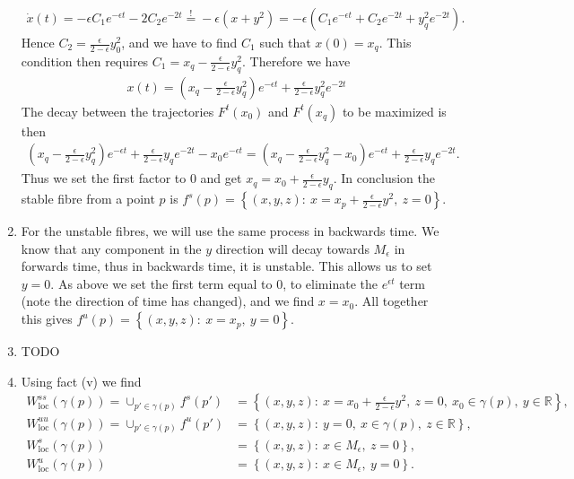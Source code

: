\begin{solution}[9.5]
\begin{enumerate}
\begin{align}
	\dot{x}(t) = - \epsilon C_1 e^{-\epsilon t} -2 C_2 e^{-2t} \stackrel{ \textrm{!} }{=} -\epsilon (x+y^{2}) = -\epsilon (C_1 e^{-\epsilon t} + C_2 e^{-2t}+y_q^2 e^{-2t}).	
\end{align}
Hence $C_2 = \frac{\epsilon}{2-\epsilon}y_0^2$, and we have to find $C_1$ such that $x(0)=x_q$. This condition then requires $C_1 = x_q - \frac{\epsilon}{2-\epsilon }y_q^2$. Therefore we have 
\begin{align}
	x(t) = (x_q - \frac{\epsilon}{2-\epsilon}y_q^2)e^{-\epsilon t} + \frac{\epsilon}{2-\epsilon}y_q^2 e^{-2t} 
\end{align}
The decay between the trajectories $F ^t(x_0)$ and $F^t(x_q)$ to be maximized is then 
\begin{align}
	(x_q - \frac{\epsilon}{2 - \epsilon}y_q^2) e^{-\epsilon t} + \frac{\epsilon}{2-\epsilon}y_qe^{-2t} - x_0 e^{-\epsilon t}= (x_q - \frac{\epsilon}{2-\epsilon}y_q^2 - x_0) e^{-\epsilon t} + \frac{\epsilon}{2-\epsilon}y_q e^{-2t}.
\end{align}
Thus we set the first factor to 0 and get $x_q = x_0 + \frac{\epsilon}{2-\epsilon}y_q$. In conclusion the stable fibre from a point $p$ is $f^s(p) = \left\{ (x,y,z):\ x=x_p + \frac{\epsilon}{2-\epsilon}y^2,\ z=0 \right\}$.
\item
	For the unstable fibres, we will use the same process in backwards time. We know that any component in the $y$ direction will decay towards $M_\epsilon$ in forwards time, thus in backwards time, it is unstable. This allows us to set $y=0$. As above we set the first term equal to 0, to eliminate the  $e^{\epsilon t}$ term (note the direction of time has changed), and we find $x=x_0$. All together this gives $f^{u}(p) = \left\{ (x,y,z): \ x=x_p,\ y=0\right\}$.
\item TODO
\item Using fact (v) we find 
	\begin{align}
		W_{ \textrm{loc} }^{ss}(\gamma(p)) = \cup_{p' \in \gamma(p)} f^{s}(p') &= 
		\left\{ (x,y,z):\ x=x_0 + \frac{\epsilon}{2-\epsilon}y^2,\ z=0,\ x_0\in\gamma(p),\ y \in \mathbb{R}\right\},\\
		W_{ \textrm{loc} }^{uu}(\gamma(p)) = \cup_{p' \in \gamma(p)} f^{u}(p') &= 
		\left\{ (x,y,z):\ y=0,\ x\in\gamma(p),\ z \in \mathbb{R}\right\},\\
		W_{ \textrm{loc} }^{s}(\gamma(p)) &= \left\{ (x,y,z):\ x\in M_\epsilon,\ z=0\right\}, \\
		W_{ \textrm{loc} }^{u}(\gamma(p)) &= \left\{ (x,y,z):\ x\in M_\epsilon,\  y=0\right\}. 
	\end{align}
\end{enumerate}
\end{solution}

